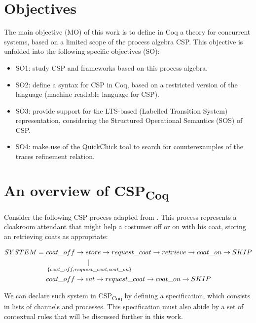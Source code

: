 \section{Objectives}

The main objective (MO) of this work is to define in Coq a theory for concurrent systems, based on a limited scope of the process algebra CSP. This objective is unfolded into the following specific objectives (SO):

\begin{itemize}  
	\item SO1: study CSP and frameworks based on this process algebra. 
	\item SO2: define a syntax for CSP in Coq, based on a restricted version of the \CSPM{} language (machine readable language for CSP). 
	\item SO3: provide support for the LTS-based (Labelled Transition System) representation, considering the Structured Operational Semantics (SOS) of CSP.
	\item SO4: make use of the QuickChick tool to search for counterexamples of the traces refinement relation.
\end{itemize}

\section{An overview of CSP\textsubscript{Coq}}

Consider the following CSP process adapted from . This process represents a cloakroom attendant that might help a costumer off or on with his coat, storing an retrieving coats as appropriate:

\begin{align}
	SYSTEM =\ &coat\_off \then store \then request\_coat \then retrieve \then coat\_on \then \SKIP\notag\\
			  &\parallel[\{coat\_off, request\_coat, coat\_on\}]\notag\\
	  		  &coat\_off \then eat \then request\_coat \then coat\_on \then \SKIP\notag
\end{align}

We can declare such system in CSP\textsubscript{Coq} by defining a specification, which consists in lists of channels and processes. This specification must also abide by a set of contextual rules that will be discussed further in this work.

